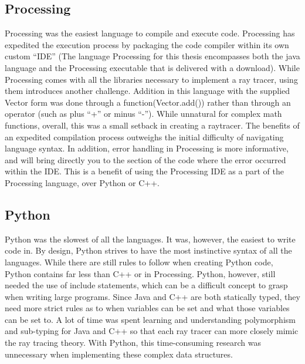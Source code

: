 \subsection{Processing}
Processing was the easiest language to compile and execute code.  Processing has expedited the execution process by packaging the code compiler within its own custom ``IDE'' (The language Processing for this thesis encompasses both the java language and the Processing executable that is delivered with a download).  While Processing comes with all the libraries necessary to implement a ray tracer, using them introduces another challenge.  Addition in this language with the supplied Vector form was done through a function(Vector.add()) rather than through an operator (such as plus ``+'' or minus ``-'').  While unnatural for complex math functions, overall, this was a small setback in creating a raytracer.  The benefits of an expedited compilation process outweighs the initial difficulty of navigating language syntax.  In addition, error handling in Processing is more informative, and will bring directly you to the section of the code where the error occurred within the IDE.  This is a benefit of using the Processing IDE as a part of the Processing language, over Python or C++.

\subsection{Python}
Python was the slowest of all the languages.  It was, however, the easiest to write code in.  By design, Python strives to have the most instinctive syntax of all the languages.  While there are still rules to follow when creating Python code, Python contains far less than C++ or in Processing.  Python, however, still needed the use of include statements, which can be a difficult concept to grasp when writing large programs. Since Java and C++ are both statically typed, they need more strict rules as to when variables can be set and what those variables can be set to.  A lot of time was spent learning and understanding polymorphism and sub-typing for Java and C++ so that each ray tracer can more closely mimic the ray tracing theory.  With Python, this time-consuming research was unnecessary when implementing these complex data structures.

